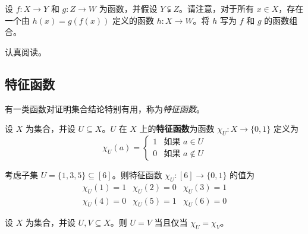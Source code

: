 \begin{exercise}
\label{exCompositionWithoutMatchingCodomains}
设 $f : X \to Y$ 和 $g : Z \to W$ 为函数，并假设 $Y \subsetneqq Z$。请注意，对于所有 $x \in X$，存在一个由 $h(x)=g(f(x))$ 定义的函数 $h : X \to W$。将 $h$ 写为 $f$ 和 $g$ 的函数组合。
\begin{backhint}
认真阅读。
\end{backhint}
\end{exercise}

\subsection*{特征函数}

有一类函数对证明集合结论特别有用，称为\textit{特征函数}。

\begin{definition}
\label{defCharacteristicFunction}
设 $X$ 为集合，并设 $U \subseteq X$。$U$ 在 $X$ 上的\textbf{特征函数}为函数 $\chi_U : X \to \{ 0,1 \}$  定义为
\[ \chi_U(a) = \begin{cases} 1 & \text{如果 } a \in U \\ 0 & \text{如果 } a \not\in U \end{cases} \]
\end{definition}

\begin{example}
考虑子集 $U = \{ 1,3,5 \} \subseteq [6]$。则特征函数 $\chi_U : [6] \to \{0,1\}$ 的值为
\[ \begin{matrix} \chi_U(1) = 1 & \chi_U(2) = 0 & \chi_U(3) = 1 \\ \chi_U(4) = 0 & \chi_U(5) = 1 & \chi_U(6) = 0 \end{matrix} \]
\end{example}

\begin{theorem}
\label{thmCharacteristicFunctionsCharacteriseSubsets}
设 $X$ 为集合，并设 $U, V \subseteq X$。则 $U=V$ 当且仅当 $\chi_U = \chi_V$。
\end{theorem}


